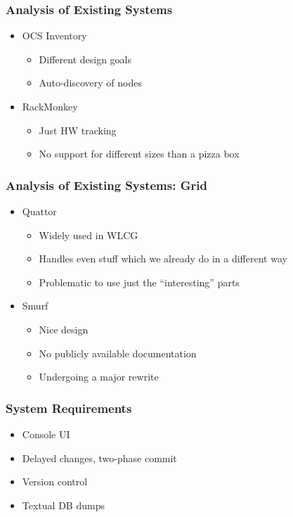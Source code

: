 \documentclass{beamer}
\begin{document}
\begin{frame}[fragile]
\frametitle{Analysis of Existing Systems}
\begin{itemize}
    \item OCS Inventory
        \begin{itemize}
            \item Different design goals
            \item Auto-discovery of nodes
        \end{itemize}
    \item RackMonkey
        \begin{itemize}
            \item Just HW tracking
            \item No support for different sizes than a pizza box
        \end{itemize}
\end{itemize}
\end{frame}

\begin{frame}[fragile]
\frametitle{Analysis of Existing Systems: Grid}
\begin{itemize}
    \item Quattor
        \begin{itemize}
            \item Widely used in WLCG
            \item Handles even stuff which we already do in a different way
            \item Problematic to use just the ``interesting'' parts
        \end{itemize}
    \item Smurf
        \begin{itemize}
            \item Nice design
            \item No publicly available documentation
            \item Undergoing a major rewrite
        \end{itemize}
\end{itemize}
\end{frame}

\begin{frame}[fragile]
\frametitle{System Requirements}
\begin{itemize}
    \item Console UI
    \item Delayed changes, two-phase commit
    \item Version control
    \item Textual DB dumps
\end{itemize}
\end{frame}
\end{document}
